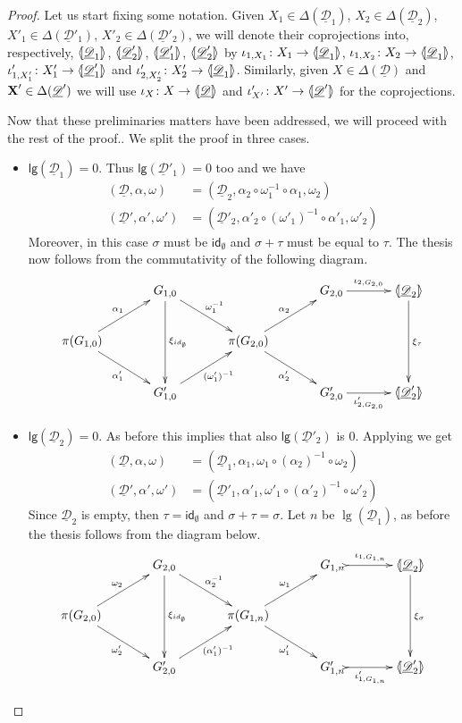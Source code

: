\documentclass[a4paper,UKenglish,cleveref,pdftex, thm-restate,numberwithinsect]{lipics}
\newcommand{\id}[1]{\mathsf{id}_{#1}}
\def\X{\textbf {\textup{X}}}
\newcommand{\dder}[1]{\mathscr{#1}}
\newcommand{\der}[1]{\underline{\dder{#1}}}
\newcommand{\lpro}{\langle \hspace{-1.85pt}[}
\newcommand{\rpro}{]\hspace{-1.85pt}\rangle}
\newcommand{\tpro}[1]{\lpro \der{#1}\rpro}
\newcommand{\lgh}[0]{\mathsf{lg}}
\begin{document}
\begin{proof}
	Let us start fixing some notation. Given $X_1\in \Delta(\der{D}_1)$, $X_2\in \Delta(\der{D}_2)$, $X'_1\in \Delta(\der{D}'_1)$, $X'_2\in \Delta(\der{D}'_2)$, we will denote their coprojections into, respectively, $\lpro \der{D}_1\rpro$, $\lpro \der{D}'_2\rpro$, $\lpro \der{D}'_1\rpro$, $\lpro \der{D}'_2\rpro$ by
	$\iota_{1, X_1}\colon X_1\to \lpro\der{D}_1\rpro$, $\iota_{1, X_2}\colon X_2\to \lpro\der{D}_1\rpro$, $\iota'_{1, X'_1}\colon X'_1\to \lpro\der{D}'_1\rpro$ and $\iota'_{2, X'_2}\colon X'_2\to \lpro\der{D}_1\rpro$. Similarly, given $X\in \Delta(\der{D})$ and $\X'\in \Delta(\der{D}')$ we will use $\iota_X\colon X\to \tpro{D}$ and $\iota'_{X'}\colon X'\to \lpro \der{D}' \rpro$ for the coprojections.
	
	Now that these preliminaries matters have been addressed, we will proceed with the rest of the proof.. We split the proof in three cases.
	\begin{itemize}
	\item $\lgh(\der{D}_1)=0$. Thus $\lgh(\der{D}'_1)=0$ too  and we have
	\begin{align*}
		(\der{D}, \alpha, \omega)&=(\der{D}_2, \alpha_2\circ \omega_1^{-1}\circ \alpha_1, \omega_2) \\ (\der{D}', \alpha', \omega')&=(\der{D}'_2, \alpha'_2\circ (\omega'_1)^{-1}\circ \alpha'_1, \omega'_2)
	\end{align*}
	Moreover, in this case $\sigma$ must be $\id{\emptyset}$ and $\sigma+\tau$ must be equal to $\tau$. The thesis now follows from the commutativity of the following diagram.
	\[\xymatrix@C=35pt{& G_{1,0}\ar[dd]^{\xi_{\id{\emptyset}}} \ar[dr]^{\omega^{-1}_1}&&G_{2,0}\ar[r]^-{\iota_{2, G_{2,0}}} & \lpro \der{D}_2\rpro \ar[dd]^{\xi_{\tau}}\\\pi(G_{1,0})  \ar[ur]^{\alpha_1} \ar[dr]_{\alpha'_1}&& \pi(G_{2,0}) \ar[ur]^{\alpha_2} \ar[dr]_{\alpha'_2}\\& G'_{1,0} \ar[ur]_{(\omega'_1)^{-1}}&&G'_{2,0} \ar[r]_-{\iota'_{2, G_{2,0}}}& \lpro \der{D}'_2\rpro}\]
	
\item $\lgh(\der{D}_2)=0$.  As before this implies that also $\lgh(\der{D}'_2)$ is $0$.  Applying  we get 
	\begin{align*}
		(\der{D}, \alpha, \omega)&=(\der{D}_1, \alpha_1, \omega_1 \circ (\alpha_2)^{-1}\circ \omega_2) \\ (\der{D}', \alpha', \omega')&=(\der{D}'_1, \alpha'_1, \omega'_1 \circ (\alpha'_2)^{-1}\circ \omega'_2)
	\end{align*}
	Since $\der{D}_2$ is empty, then $\tau=\id{\emptyset}$ and $\sigma+\tau=\sigma$. Let $n$ be $\lg(\der{D}_1)$, as before the thesis follows from the diagram below.
	\[\xymatrix@C=35pt{& G_{2,0}\ar[dd]^{\xi_{\id{\emptyset}}} \ar[dr]^{\alpha^{-1}_2}&&G_{1,n}\ar@{>->}[r]^-{\iota_{1, G_{1,n}}} & \lpro \der{D}_2\rpro \ar[dd]^{\xi_{\sigma}}\\\pi(G_{2,0})  \ar[ur]^{\omega_2} \ar[dr]_{\omega'_2}&& \pi(G_{1,n}) \ar[ur]^{\omega_1} \ar[dr]_{\omega'_1}\\& G'_{2,0} \ar[ur]_{(\alpha'_1)^{-1}}&&G'_{1,n} \ar@{>->}[r]_-{\iota'_{1, G_{1,n}}}& \lpro \der{D}'_2\rpro}\]
	

\end{itemize}
\end{proof}
\end{document}
